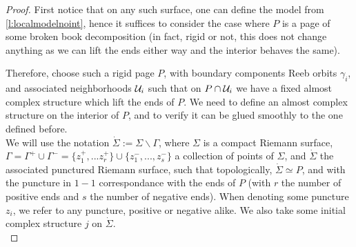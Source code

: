 \documentclass[../main.tex]{subfiles}
\begin{document}
\begin{proof}
First notice that on any such surface, one can define the model from \ref{l:localmodelnoint}, hence it suffices to consider the case where $P$ is a page of some broken book decomposition (in fact, rigid or not, this does not change anything as we can lift the ends either way and the interior behaves the same).  

Therefore, choose such a rigid page $P$, with boundary components Reeb orbits $\gamma_i$, and associated neighborhoods $\mathcal{U}_i$ such that on $P\cap\mathcal{U}_i$ we have a fixed almost complex structure which lift the ends of $P$. We need to define an almost complex structure on the interior of $P$, and to verify it can be glued smoothly to the one defined before.\\

We will use the notation $\dot{\Sigma} := \Sigma\backslash\Gamma$, where $\Sigma$ is a compact Riemann surface, $\Gamma = \Gamma^+ \cup \Gamma^- = \{z_1^+,... z_r^+\}\cup\{z_1^-,...,z_s^-\}$ a collection of points of $\Sigma$, and $\dot{\Sigma}$ the associated punctured Riemann surface, such that topologically, $\dot\Sigma \simeq P$, and with the puncture in $1-1$ correspondance with the ends of $P$ (with $r$ the number of positive ends and $s$ the number of negative ends). When denoting some puncture $z_i$, we refer to any puncture, positive or negative alike. We also take some initial complex structure $j$ on $\dot \Sigma$.\\


\end{proof}
\end{document}
